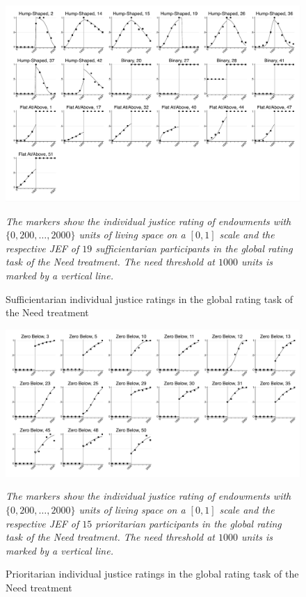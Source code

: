 \documentclass[12pt]{scrartcl}
\begin{document}
\begin{figure}[h!t!]
   \centering
   \includegraphics[width=\linewidth]{figures/figure_2.pdf}
   \begin{minipage}{\linewidth}
      \footnotesize
      \textit{The markers show the individual justice rating of endowments with $\{0,200,\ldots,2000\}$ units of living space on a $[0,1]$ scale and the respective JEF of $19$ sufficientarian participants in the global rating task of the Need treatment. The need threshold at $1000$ units is marked by a vertical line.}
   \end{minipage}
   \caption{Sufficientarian individual justice ratings in the global rating task of the Need treatment}\label{fig:figure_2}
\end{figure}

\begin{figure}[h!t!]
   \centering
   \includegraphics[width=\linewidth]{figures/figure_3.pdf}
   \begin{minipage}{\linewidth}
      \footnotesize
      \textit{The markers show the individual justice rating of endowments with $\{0,200,\ldots,2000\}$ units of living space on a $[0,1]$ scale and the respective JEF of $15$ prioritarian participants in the global rating task of the Need treatment. The need threshold at $1000$ units is marked by a vertical line.}
   \end{minipage}
   \caption{Prioritarian individual justice ratings in the global rating task of the Need treatment}\label{fig:figure_3}
\end{figure}
\end{document}
